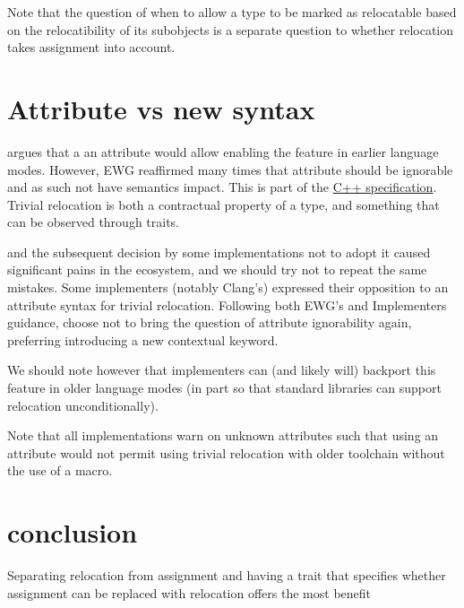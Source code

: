 \documentclass{wg21}
\begin{document}
Note that the question of when to allow a type to be marked as relocatable based on the relocatibility of its subobjects is a separate question to whether relocation takes assignment into account.

\section{Attribute vs new syntax}

 argues that a an attribute would allow enabling the feature in earlier language modes.
However, EWG reaffirmed many times that attribute should be ignorable and as such not have semantics impact.
This is part of the \href{https://eel.is/c++draft/dcl.attr#grammar-note-5}{C++ specification}.
Trivial relocation is both a contractual property of a type, and something that can be observed through traits.


 and the subsequent decision by some implementations not to adopt it caused significant pains
in the ecosystem, and we should try not to repeat the same mistakes.
Some implementers (notably Clang's) expressed their opposition to an attribute syntax for trivial relocation.
Following both EWG's and Implementers guidance,  choose not to bring the question of attribute ignorability again,
preferring introducing a new contextual keyword.

We should note however that implementers can (and likely will) backport this feature in older language modes
(in part so that standard libraries can support relocation unconditionally).

Note that all implementations warn on unknown attributes such that using an attribute would not permit using
trivial relocation with older toolchain without the use of a macro.


\section{conclusion}

Separating relocation from assignment and having a trait that specifies whether assignment can be replaced with relocation offers the most benefit
\end{document}
